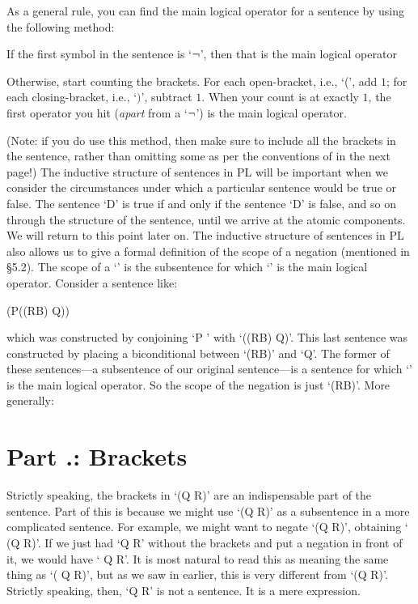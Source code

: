 As a general rule, you can find the main logical operator for a sentence by using the following method:
\begin{ebullet}
	\item[\textbullet] If the first symbol in the sentence is `$\neg$', then that is the main logical operator
	\item[\textbullet] Otherwise, start counting the brackets. For each open-bracket, i.e., `(', add $1$; for each closing-bracket, i.e., `$)$', subtract $1$. When your count is at exactly $1$, the first operator you hit (\emph{apart} from a `$\neg$') is the main logical operator.
\end{ebullet}
(Note: if you do use this method, then make sure to include all the brackets in the sentence, rather than omitting some as per the conventions of in the next page!)
The inductive structure of sentences in PL will be important when we consider the circumstances under which a particular sentence would be true or false. The sentence ‘\enot\enot\enot D’ is true if and only if the sentence ‘\enot\enot D’ is false, and so on through the structure of the sentence, until we arrive at the atomic components. We will return to this point later on.
The inductive structure of sentences in PL also allows us to give a formal definition of the scope of a negation (mentioned in §5.2). The scope of a ‘\enot’ is the subsentence for which ‘\enot’ is the main logical operator. Consider a sentence like:
\begin{center}(P\eand (\enot(R\eand B) \eiff  Q))\end{center}
which was constructed by conjoining ‘P ’ with ‘(\enot(R\eand B) \eiff  Q)’. This last sentence was constructed by placing a biconditional between ‘\enot(R\eand B)’ and ‘Q’. The former of these sentences—a subsentence of our original sentence—is a sentence for which ‘\enot’ is the main logical operator. So the scope of the negation is just ‘\enot(R\eand B)’. More generally:
\section{Part \thechapcount.\theseccount: Brackets}
Strictly speaking, the brackets in ‘(Q \eand  R)’ are an indispensable part of the sentence. Part of this is because we might use ‘(Q \eand R)’ as a subsentence in a more complicated sentence. For example, we might want to negate ‘(Q \eand  R)’, obtaining ‘ \enot (Q \eand  R)’. If we just had ‘Q \eand R’ without the brackets and put a negation in front of it, we would have ‘ \enot Q \eand  R’. It is most natural to read this as meaning the same thing as ‘( \enot Q \eand R)’, but as we saw in earlier, this is very different from ‘\enot(Q \eand  R)’.
Strictly speaking, then, ‘Q \eand  R’ is not a sentence. It is a mere expression.

